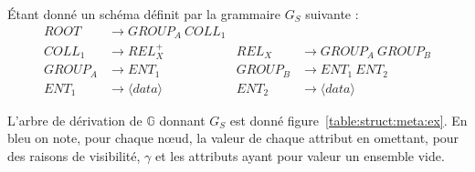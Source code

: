 \begin{example}
    Étant donné un schéma définit par la grammaire $G_S$ suivante :
    \begin{align*}
        ROOT    & \to GROUP_A ~ COLL_1                                          \\
        COLL_1  & \to REL_X^+              & REL_X   & \to GROUP_A ~ GROUP_B    \\
        GROUP_A & \to ENT_1                & GROUP_B & \to ENT_1 ~ ENT_2        \\
        ENT_1   & \to \langle data \rangle & ENT_2   & \to \langle data \rangle
    \end{align*}

    L'arbre de dérivation de $\mathbb{G}$ donnant $G_S$ est donné figure~\ref{table:struct:meta:ex}.
    En bleu on note, pour chaque nœud, la valeur de chaque attribut en omettant, pour des raisons de visibilité, $\gamma$ et les attributs ayant pour valeur un ensemble vide.
\end{example}

